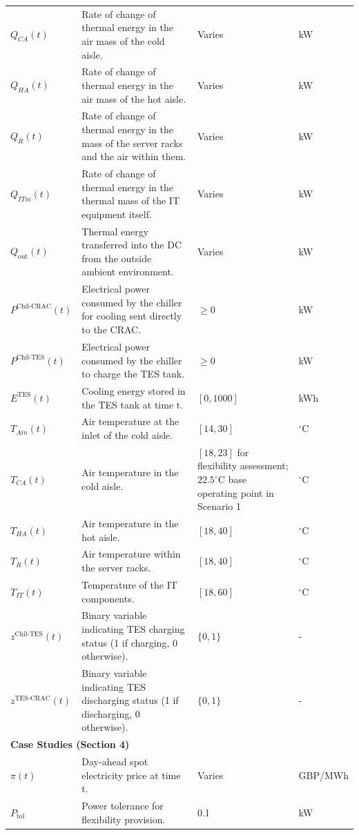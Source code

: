 \documentclass[lettersize,journal]{IEEEtran}
\newcommand{\rev}[1]{\textcolor{blue!70!black}{#1}}
\begin{document}
{{\begin{longtable}{p{} p{} p{} p{}}
$Q_{CA}(t)$ & Rate of change of thermal energy in the air mass of the cold aisle. & Varies &kW \\
$Q_{HA}(t)$ & Rate of change of thermal energy in the air mass of the hot aisle. & Varies &kW \\
$Q_{R}(t)$ & Rate of change of thermal energy in the mass of the server racks and the air within them. & Varies &kW \\
$Q_{ITm}(t)$ & Rate of change of thermal energy in the thermal mass of the IT equipment itself. & Varies &kW \\
$Q_{\mathrm{out}}(t)$ & Thermal energy transferred into the DC from the outside ambient environment. & Varies &kW \\
$P^{\mathrm{Chil}\text{-}\mathrm{CRAC}}(t)$ & Electrical power consumed by the chiller for cooling sent directly to the CRAC. & $\geq 0$ &kW \\
$P^{\mathrm{Chil}\text{-}\mathrm{TES}}(t)$ & Electrical power consumed by the chiller to charge the TES tank. & $\geq 0$ &kW \\
$E^{\mathrm{TES}}(t)$ & Cooling energy stored in the TES tank at time t. & $[0, 1000]$ &kWh \\
$T_{Ain}(t)$ & Air temperature at the inlet of the cold aisle. & $[14, 30]$ & $^{\circ}$C \\
$T_{CA}(t)$ & Air temperature in the cold aisle. & \rev{$[18,23]$ for flexibility assessment; $22.5^\circ$C base operating point in Scenario 1} & $^{\circ}$C \\
$T_{HA}(t)$ & Air temperature in the hot aisle. & $[18, 40]$ & $^{\circ}$C \\
$T_{R}(t)$ & Air temperature within the server racks. & $[18, 40]$ & $^{\circ}$C \\
$T_{IT}(t)$ & Temperature of the IT components. & $[18, 60]$ & $^{\circ}$C \\
$z^{\mathrm{Chil}\text{-}\mathrm{TES}}(t)$ & Binary variable indicating TES charging status (1 if charging, 0 otherwise). & $\{0, 1\}$ & - \\
$z^{\mathrm{TES}\text{-}\mathrm{CRAC}}(t)$ & Binary variable indicating TES discharging status (1 if discharging, 0 otherwise). & $\{0, 1\}$ & - \\
\midrule
\multicolumn{4}{l}{\textbf{Case Studies (Section 4)}} \\
\midrule
$\pi(t)$ & Day-ahead spot electricity price at time t. & Varies & GBP/MWh \\
$P_{\mathrm{tol}}$ & Power tolerance for flexibility provision. & 0.1 &kW \\

\end{longtable}}}
\end{document}
